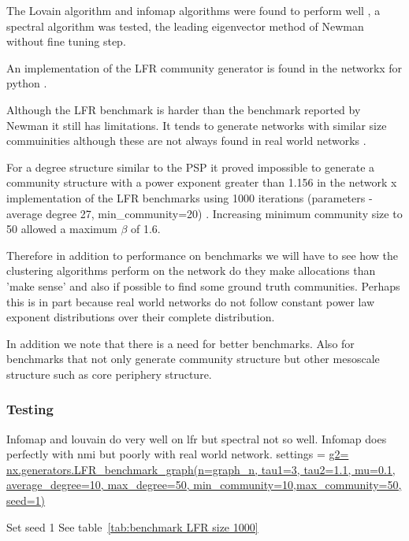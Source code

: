 The Lovain algorithm and infomap algorithms were found to perform well \cite{lancichinetti2008benchmark} \cite{lancichinetti2009community}, a spectral algorithm was tested, the leading eigenvector method of Newman \cite{newman2006finding} without fine tuning step. 

An implementation of the LFR community generator is found in the networkx for python \cite{hagberg2008exploring}.

Although the LFR benchmark is harder than the benchmark reported by Newman it still has limitations. It tends to generate networks with similar size commuinities although these are not always found in real world networks \cite{orman2013towards} \cite{aldecoa2013exploring}. 

For a degree structure similar to the PSP it proved impossible to generate a community structure with a power exponent greater than 1.156 in the network x implementation of the LFR benchmarks using 1000 iterations (parameters - average degree 27, min\_community=20) .  Increasing minimum community size to 50 allowed a maximum $\beta$ of 1.6.

Therefore in addition to performance on benchmarks we will have to see how the clustering algorithms perform on the network do they make allocations than 'make sense' and also if possible to find some ground truth communities. Perhaps this is in part because real world networks do not follow constant power law exponent distributions over their complete distribution. 

In addition we note that there is a need for better benchmarks. Also for benchmarks that not only generate community structure but other mesoscale structure such as core periphery structure. 
\subsubsection{Testing}
Infomap and louvain do very well on lfr but spectral not so well. Infomap does perfectly with nmi but poorly with real world network. 
settings = \url{g2= nx.generators.LFR_benchmark_graph(n=graph_n, tau1=3, tau2=1.1, mu=0.1, average_degree=10, max_degree=50, min_community=10,max_community=50, seed=1)}

Set seed 1 See table~\ref{tab:benchmark LFR size 1000}

